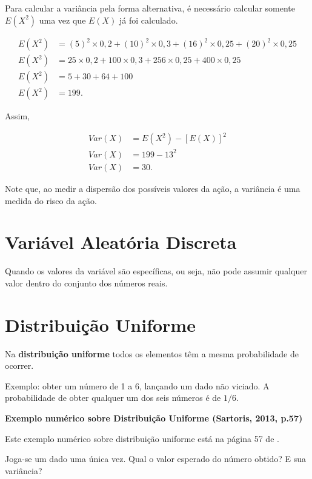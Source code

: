 \documentclass[
]{book}
\begin{document}
Para calcular a variância pela forma alternativa, é necessário calcular somente \(E(X^2)\) uma vez que \(E(X)\) já foi calculado.

\begin{align}
  E(X^2) &= (5)^2 \times 0,2 + (10)^2 \times 0,3 + (16)^2 \times 0,25 + (20)^2 \times 0,25 \\
  E(X^2) &= 25 \times 0,2 + 100 \times 0,3 + 256 \times 0,25 + 400 \times 0,25 \\
  E(X^2) &= 5 + 30 + 64 + 100 \\
  E(X^2) &= 199.
\end{align}

Assim,

\begin{align}
  Var(X) &= E(X^2) - [E(X)]^2\\
  Var(X) &= 199 - 13^2 \\
  Var(X) &= 30.
\end{align}

Note que, ao medir a dispersão dos possíveis valores da ação, a variância é uma medida do risco da ação.

\hypertarget{variuxe1vel-aleatuxf3ria-discreta-1}{%
\section{Variável Aleatória Discreta}\label{variuxe1vel-aleatuxf3ria-discreta-1}}

Quando os valores da variável são específicas, ou seja, não pode assumir qualquer valor dentro do conjunto dos números reais.

\hypertarget{distribuiuxe7uxe3o-uniforme}{%
\section{Distribuição Uniforme}\label{distribuiuxe7uxe3o-uniforme}}

Na \textbf{distribuição uniforme} todos os elementos têm a mesma probabilidade de ocorrer.

Exemplo: obter um número de 1 a 6, lançando um dado não viciado. A probabilidade de obter qualquer um dos seis números é de \(1/6\).

\textbf{Exemplo numérico sobre Distribuição Uniforme (Sartoris, 2013, p.57)}

Este exemplo numérico sobre distribuição uniforme está na página 57 de \citet{Sartoris2013}.

Joga-se um dado uma única vez. Qual o valor esperado do número obtido? E sua variância?
\end{document}

